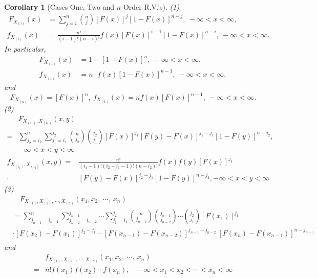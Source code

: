 \documentclass[openany,12pt]{book}
\newtheorem{corollary}{Corollary}[chapter]
\begin{document}
\begin{corollary}[Cases One, Two and $n$ Order R.V.'s]

(1)
\[\begin{aligned}
\ F_{X_{\left( i \right)}}(x) &= \sum_{j = i}^{n}{\binom{n}{j}\left[ F(x) \right]^{j}\left[ 1 - F(x) \right]^{n - j}},\ -\infty < x < \infty,\\
f_{X_{\left( i \right)}}(x) &= \frac{n!}{\left( i - 1 \right)!\left( n - i \right)!}f(x)\left[ F(x) \right]^{i - 1}\left[ 1 - F(x) \right]^{n - i},\ -\infty < x < \infty.
\end{aligned}\]
In particular,
\[\begin{aligned}
F_{X_{\left( 1 \right)}}(x) &= 1 - \left[ 1 - F(x) \right]^{n},\ -\infty < x < \infty,\\
f_{X_{\left( 1 \right)}}(x) &= n\cdot f(x)\left[ 1 - F(x) \right]^{n - 1},\ -\infty < x < \infty,
\end{aligned}\]
and
\[F_{X_{\left( n \right)}}(x) = \left[ F(x) \right]^{n},\ f_{X_{\left( 1 \right)}}(x) = nf(x)\left[ F(x) \right]^{n - 1},\ -\infty < x < \infty.\]
(2)
\[\begin{aligned}
&F_{X_{\left( i_{1} \right)},X_{\left( i_{2} \right)}}(x,y)\\
=& \sum_{j_{2} = i_{2}}^{n}{\sum_{j_{1} = i_{1}}^{j_{2}}{\binom{n}{j_{2}}  \binom{j_{2}}{j_{1}} \left[ F(x) \right]^{j_{1}}\left[ F(y) - F(x) \right]^{j_{2} - j_{1}}\left[ 1 - F(y) \right]^{n - j_{2}}}},\\
& - \infty < x < y < \infty
\end{aligned}\]
\[\begin{aligned}
f_{X_{\left( i_{1} \right)},X_{\left( i_{2} \right)}}(x,y) =& \frac{n!}{\left( i_{1} - 1 \right)!\left( i_{2} - i_{1} - 1 \right)!\left( n - i_{2} \right)!}f(x)f(y)\left[ F(x) \right]^{j_{1}}
\\
\cdot &\left[ F(y) - F(x) \right]^{j_{2} - j_{1}}\left[ 1 - F(y) \right]^{n - j_{2}}, - \infty < x < y < \infty
\end{aligned}\]
(3)
\[\begin{aligned}
&\quad F_{X_{(1)},X_{(2)},\ \cdots,X_{(n)}}\left( x_{1},x_{2},\ \cdots,\ x_{n} \right)\\
&= \sum_{j_{n - 1} = i_{n - 1}}^{n}{\sum_{j_{n - 2} = i_{n - 2}}^{j_{n - 1}}\cdots}\sum_{j_{1} = i_{1}}^{j_{2}} \binom{n}{j_{n - 1}}  \binom{j_{n - 1}}{j_{n - 2}} \cdots\binom{j_{2}}{j_{1}}\left[ F( x_{1} ) \right]^{j_{1}}\\
&\cdot\left[ F( x_{2} ) - F( x_{1} ) \right]^{j_{2} - j_{1}}\cdots\ \left[ F( x_{n - 1} ) - F( x_{n - 2} ) \right]^{j_{n - 1} - j_{n - 2}}\ \left[ F( x_{n} ) - F( x_{n - 1} ) \right]^{n - j_{n - 1}}\\
\end{aligned}\]
and
\[\begin{aligned}
&f_{X_{\left( 1 \right)},X_{\left( 2 \right)},\ \cdots,X_{\left( n \right)}}\left( x_{1},x_{2},\ \cdots,\ x_{n} \right)\\
=& n!f(x_{1})f(x_{2})\cdots f(x_{n}),\ \ \  - \infty < x_{1} < x_{2} < \cdots < x_{n} < \infty
\end{aligned}\]
\end{corollary}
\end{document}
